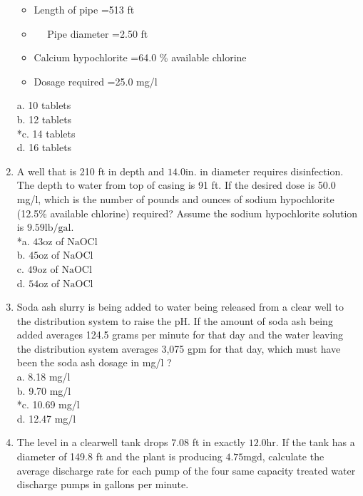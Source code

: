 \begin{enumerate}
\begin{itemize}
  \item Length of pipe =513 ft\\
  \item $\quad$ Pipe diameter =2.50 ft\\
  \item Calcium hypochlorite =64.0 \% available chlorine\\
  \item Dosage required =25.0 mg/l\\
  \end{itemize}
a. 10 tablets\\
b. 12 tablets\\
*c. 14 tablets\\
d. 16 tablets \\
\item A well that is 210 ft in depth and $14.0 \mathrm{in}$. in diameter requires disinfection. The depth to water from top of casing is 91 ft. If the desired dose is 50.0 mg/l, which is the number of pounds and ounces of sodium hypochlorite (12.5\% available chlorine) required? Assume the sodium hypochlorite solution is $9.59 \mathrm{lb} / \mathrm{gal}$.\\
*a. $43 \mathrm{oz}$ of $\mathrm{NaOCl}$\\
b. $45 \mathrm{oz}$ of $\mathrm{NaOCl}$\\
c. $49 \mathrm{oz}$ of $\mathrm{NaOCl}$\\
d. $54 \mathrm{oz}$ of $\mathrm{NaOCl}$\\
  \item Soda ash slurry is being added to water being released from a clear well to the distribution system to raise the pH. If the amount of soda ash being added averages 124.5 grams per minute for that day and the water leaving the distribution system averages 3,075 gpm for that day, which must have been the soda ash dosage in mg/l ?\\
a. 8.18 mg/l\\
b. 9.70 mg/l\\
*c. 10.69 mg/l\\
d. 12.47 mg/l\\
  \item The level in a clearwell tank drops 7.08 ft in exactly $12.0 \mathrm{hr}$. If the tank has a diameter of 149.8 ft and the plant is producing $4.75 \mathrm{mgd}$, calculate the average discharge rate for each pump of the four same capacity treated water discharge pumps in gallons per minute.\\

\end{enumerate}
